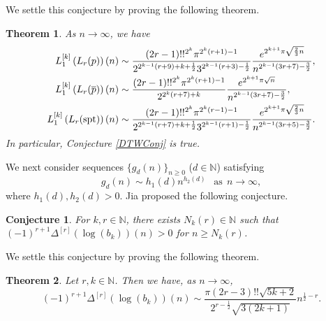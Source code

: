 \documentclass[11pt,reqno,a4paper]{amsart}
\newcommand{\N}{\mathbb{N}}
\renewcommand{\(}{\left\(}
\renewcommand{\)}{\right\)}
\newcommand{\pa}[2]{\left(\frac{#1}{#2}\right)}
\numberwithin{equation}{section}
\theoremstyle{plain}
\newtheorem{theorem}{Theorem}[section]
\theoremstyle{definition} %
\newcounter{specialstatement}
\newtheorem{conjecture}[specialstatement]{Conjecture}
\numberwithin{equation}{section}
\begin{document}
We settle this conjecture by proving the following theorem.




\begin{theorem}\label{itlagthm3}
	As $n\to \infty$, we have
	\begin{align*}
	L^{[k]}_1\left(L_r(p)\right)(n)&\sim \frac{(2r-1)!!^{2^k}\pi^{2^k(r+1)-1}}{2^{2^{k-1}\left(r+9\right)+k+\frac 12}3^{2^{k-1}\left(r+3\right)-\frac 12}}\frac{e^{2^{k+1}\pi\sqrt{\frac{2}{3}n}}}{n^{2^{k-1}\left(3r+7\right)-\frac 32}},\\%
	L^{[k]}_1\left(L_r(\overline{p})\right)(n)&\sim \frac{(2r-1)!!^{2^k}\pi^{2^k(r+1)-1}}{2^{2^k\left(r+7\right)+k}}\frac{e^{2^{k+1}\pi\sqrt{n}}}{n^{2^{k-1}\left(3r+7\right)-\frac 32}},\\ %
	L^{[k]}_1\left(L_r(\textup{spt})\right)(n)&\sim \frac{(2r-1)!!^{2^k}\pi^{2^k(r-1)-1}}{2^{2^{k-1}\left(r+7\right)+k+\frac 12}3^{2^{k-1}\left(r+1\right)-\frac 12}}\frac{e^{2^{k+1}\pi\sqrt{\frac{2}{3}n}}}{n^{2^{k-1}\left(3r+5\right)-\frac 32}}.%
	\end{align*}	
 In particular, Conjecture \ref{DTWConj} is true.
\end{theorem} 








 We next consider sequences $\{g_d(n)\}_{n\ge 0}$ ($d\in \mathbb{N}$) satisfying
\begin{equation}\label{loggenexample}
g_d(n)\sim h_1(d) n^{h_2(d)}\ \ \text{ as}\ \ n\to \infty,
\end{equation}
where $h_1(d), h_2(d)>0$. Jia \cite[Conjecture 1.8]{Jia} proposed the following conjecture.
\begin{conjecture}\label{brokenlogdiffconj}
{\it For $k, r\!\in\!\mathbb{N}$, there exists $N_k(r)\in\N$ such that %
	$
	(-1)^{r+1}\Delta^{[r]}(\log(b_k))(n)>0$ for $n\ge N_k(r)$.}
\end{conjecture}
We settle this conjecture by proving the following theorem.
\begin{theorem}\label{logdiffconj1}
	Let $r,k\in \mathbb{N}$. Then we have, as $n\to \infty$, 
	\[
	(-1)^{r+1}\Delta^{[r]}\left(\log(b_k)\right)(n)\sim %
	\frac{\pi(2r-3)!!\sqrt{5k+2}}{2^{r-\frac 12} \sqrt{3\left(2k+1\right)}}n^{\frac 12-r}.
	\]
\end{theorem}
\end{document}

